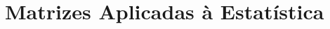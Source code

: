 \chapter[Matrizes Aplicadas à Estatística]{Matrizes Aplicadas à Estatística}
\label{ch:linear_algebra}
